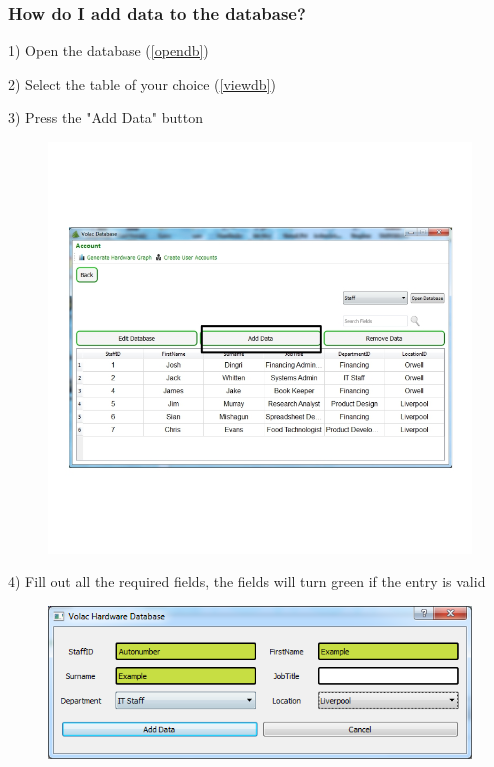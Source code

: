 \subsubsection{How do I add data to the database?}\label{adddata}

1) Open the database (\ref{opendb})

2) Select the table of your choice (\ref{viewdb})

3) Press the "Add Data" button

\begin{figure}[H]
    \includegraphics[width=\textwidth]{./Manual/Images/adddata.jpg}
\end{figure}

4) Fill out all the required fields, the fields will turn green if the entry is valid

\begin{figure}[H]
    \includegraphics[width=\textwidth]{./Manual/Images/adddata2.png}
\end{figure}

